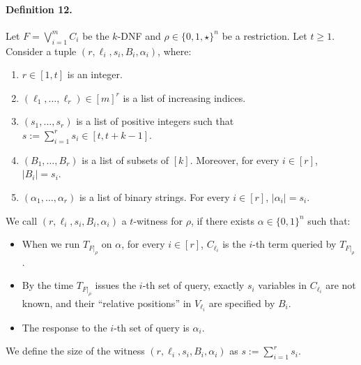 \paragraph{Definition 12.} Let $F=\bigvee_{i=1}^mC_i$ be the $k$-DNF and $\rho\in\{0,1,\star\}^n$ be a restriction. Let $t\ge1$. Consider a tuple $(r,\ell_i,s_i,B_i,\alpha_i)$, where:
\begin{enumerate}\item $r\in[1,t]$ is an integer.
\item $(\ell_1,\ldots,\ell_r)\in[m]^r$ is a list of increasing indices.
\item $(s_1,\ldots,s_r)$ is a list of positive integers such that $s:=\sum_{i=1}^rs_i\in[t,t+k-1]$.
\item $(B_1,\ldots,B_r)$ is a list of subsets of $[k]$. Moreover, for every $i\in[r]$, $|B_i|=s_i$.
\item $(\alpha_1,\ldots,\alpha_r)$ is a list of binary strings. For every $i\in[r]$, $|\alpha_i|=s_i$.\end{enumerate}
We call $(r,\ell_i,s_i,B_i,\alpha_i)$ a $t$-witness for $\rho$, if there exists $\alpha\in\{0,1\}^n$ such that:
\begin{itemize}\item When we run $T_{F|_\rho}$ on $\alpha$, for every $i\in[r]$, $C_{\ell_i}$ is the $i$-th term queried by $T_{F|_\rho}$.
\item By the time $T_{F|_\rho}$ issues the $i$-th set of query, exactly $s_i$ variables in $C_{\ell_i}$ are not known, and their ``relative positions'' in $V_{\ell_i}$ are specified by $B_i$.
\item The response to the $i$-th set of query is $\alpha_i$.\end{itemize}
We define the size of the witness $(r,\ell_i,s_i,B_i,\alpha_i)$ as $s:=\sum_{i=1}^rs_i$.
